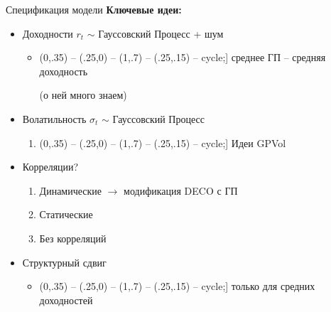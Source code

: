 \documentclass[14pt]{beamer}
\def\checkmarksmall{\tikz\fill[scale=0.5](0,.35) -- (.25,0) -- (1,.7) -- (.25,.15) -- cycle;}
\begin{document}
\begin{frame}{Спецификация модели}
\textbf{Ключевые идеи:}
\begin{itemize}
	\item Доходности $r_t$ $\sim$ Гауссовский Процесс + шум
	\begin{itemize}
		\item[\checkmarksmall] среднее ГП -- средняя доходность
		
		(о ней много знаем)
	\end{itemize}
	\item<2-> Волатильность $\sigma_t$ $\sim$ Гауссовский Процесс
	\begin{enumerate}
		\item[\checkmarksmall] Идеи GPVol
	\end{enumerate}
	\item<3-> Корреляции?
	\begin{enumerate}
		\item Динамические $\rightarrow$ модификация DECO с ГП
		\item Статические 
		\item Без корреляций
	\end{enumerate}
	\item<4-> Структурный сдвиг
	\begin{itemize}
		\item[\checkmarksmall] только для средних доходностей
	\end{itemize}
\end{itemize}
\end{frame}
\end{document}

